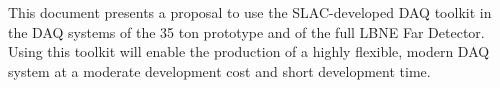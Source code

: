 This document presents a proposal to use the SLAC-developed DAQ toolkit 
in the DAQ systems of the 35 ton prototype and of the full LBNE Far Detector.
Using this toolkit will enable the production of a highly flexible, modern DAQ
system at a moderate development cost and short development time.